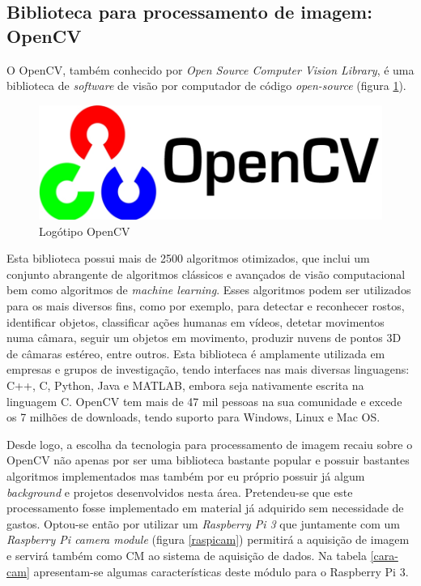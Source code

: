 \subsection{Biblioteca para processamento de imagem: OpenCV}

O OpenCV, também conhecido por \textit{Open Source Computer Vision Library}, é uma biblioteca de \textit{software} de visão por computador de código \textit{open-source} (figura \ref{opencvlogo}). 

\begin{figure}[!htb]
	\centering
	\includegraphics[width=0.3\linewidth]{img/vision/opencv_logo.jpg}
	\caption{Logótipo OpenCV}
	\label{opencvlogo}
\end{figure}

Esta biblioteca possui mais de 2500 algoritmos otimizados, que inclui um conjunto abrangente de algoritmos clássicos e avançados de visão computacional bem como algoritmos de \textit{machine learning}. Esses algoritmos podem ser utilizados para os mais diversos fins, como por exemplo, para detectar e reconhecer rostos, identificar objetos, classificar ações humanas em vídeos, detetar movimentos numa câmara, seguir um objetos em movimento, produzir nuvens de pontos 3D de câmaras estéreo, entre outros. Esta biblioteca é amplamente utilizada em empresas e grupos de investigação, tendo interfaces nas mais diversas linguagens: C++, C, Python, Java e MATLAB, embora seja nativamente escrita na linguagem C. OpenCV tem mais de 47 mil pessoas na sua comunidade e excede os 7 milhões de downloads, tendo suporto para Windows, Linux e Mac OS\cite{Itseez}.




Desde logo, a escolha da tecnologia para processamento de imagem recaiu sobre o OpenCV não apenas por ser uma biblioteca bastante popular e possuir bastantes algoritmos implementados mas também por eu próprio possuir já algum \textit{background} e projetos desenvolvidos nesta área.  Pretendeu-se que este processamento fosse implementado em material já adquirido sem necessidade de gastos. Optou-se então por utilizar um \textit{Raspberry Pi 3} que juntamente com um \textit{Raspberry Pi camera module} (figura \ref{raspicam}) permitirá a aquisição de imagem e servirá também como \acl{CM} ao sistema de aquisição de dados. Na tabela \ref{cara-cam} apresentam-se algumas características deste módulo para o Raspberry Pi 3. 


